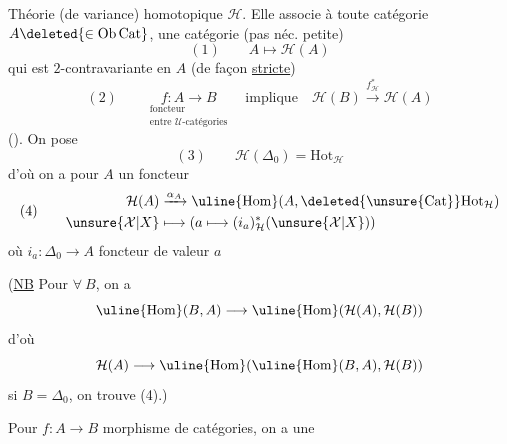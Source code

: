 Théorie (de variance) homotopique $\mathcal H$.
Elle associe à toute  catégorie
$A\deleted{\in\operatorname{Ob}\mathrm{Cat}}$,
une catégorie
(pas néc. petite)
\[
(1)\qquad \boxed{A\longmapsto\mathcal H(A)}
\]
qui est $2$-contravariante en $A$ (de façon \uline{stricte})
\[
(2)\qquad
\underset{\substack{\text{foncteur}\\\text{entre $\mathcal U$-catégories}}}{f:A\longrightarrow B}
\quad\text{implique}\quad
\mathcal H(B)\xrightarrow{f_{\mathcal H}^{*}}\mathcal H(A)
\]
(). On pose
\[
(3)\qquad \mathcal H(\Delta_0)=\mathrm{Hot}_{\mathcal H}
\]
d'où on a pour  $A$ un foncteur
\[
(4)\qquad
\begin{aligned}
\mathcal H(A)&\xrightarrow{\alpha_A}
\uline{\operatorname{Hom}}(A,\deleted{\unsure{\mathrm{Cat}}}\mathrm{Hot}_{\mathcal H})\\
\unsure{\mathcal X|X}&\longmapsto(a\longmapsto(i_a)_{\mathcal H}^{*}(\unsure{\mathcal X|X}))
\end{aligned}
\]
où $i_a:\Delta_0\longrightarrow A$ foncteur de valeur $a$

(\uline{NB} Pour $\forall\ B$, on a
\[
\uline{\operatorname{Hom}}(B,A)\longrightarrow
\uline{\operatorname{Hom}}(\mathcal H(A),\mathcal H(B))
\]
d'où
\[
\mathcal H(A)\longrightarrow
\uline{\operatorname{Hom}}(\uline{\operatorname{Hom}}(B,A),\mathcal H(B))
\]
si $B=\Delta_0$, on trouve (4).)

Pour $f:A\longrightarrow B$
morphisme de catégories, on a une
